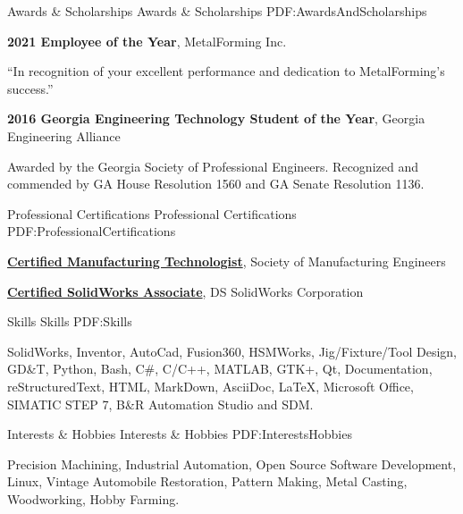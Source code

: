 \documentclass[
letterpaper,
MMMyyyy,
nonstopmode,
]{resume}
\begin{document}
\begin{Body}

\Section
{Awards \&\newline
Scholarships}
{Awards \& Scholarships}
{PDF:AwardsAndScholarships}

\textbf{2021 Employee of the Year},
MetalForming Inc.
\begin{Detail}
\SubBulletItem
“In recognition of your excellent performance and dedication to MetalForming’s success.”
\end{Detail}

\Gap

\textbf{2016 Georgia Engineering Technology Student of the Year},
Georgia Engineering Alliance
\begin{Detail}
\SubBulletItem
Awarded by the Georgia Society of Professional Engineers.
\SubBulletItem
Recognized and commended by GA House Resolution 1560 and GA Senate Resolution 1136.
\end{Detail}

\Gap


\Section
{Professional Certifications}
{Professional Certifications}
{PDF:ProfessionalCertifications}

\textbf{\href{http://www.sme.org/cmfgt/}
{Certified Manufacturing Technologist}},
Society of Manufacturing Engineers

\textbf{\href{http://www.solidworks.com/sw/support/mcad-certification-programs.htm}
{Certified SolidWorks Associate}},
DS SolidWorks Corporation



\Section
{Skills}
{Skills}
{PDF:Skills}

\Entry
SolidWorks, Inventor, AutoCad, Fusion360, HSMWorks,
Jig/Fixture/Tool Design, GD\&T,
Python, Bash, C\#, C/C++, MATLAB, GTK+, Qt,
Documentation, reStructuredText, HTML, MarkDown, AsciiDoc, \LaTeX,
Microsoft Office, SIMATIC STEP 7, B\&R Automation Studio and SDM.



\Section
{Interests \& Hobbies}
{Interests \& Hobbies}
{PDF:InterestsHobbies}

\Entry
Precision Machining,
Industrial Automation,
Open Source Software Development,
Linux,
Vintage Automobile Restoration,
Pattern Making, Metal Casting,
Woodworking, Hobby Farming.

\end{Body}
\end{document}

